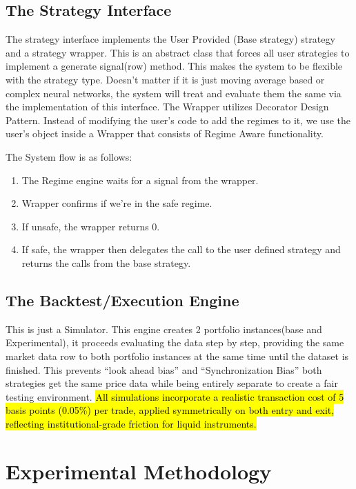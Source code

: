 \documentclass[conference]{IEEEtran}
\begin{document}
\subsection{The Strategy Interface}

The strategy interface implements the User Provided (Base strategy) strategy and a strategy wrapper. This is an abstract class that forces all user strategies to implement a generate signal(row) method. This makes the system to be flexible with the strategy type. Doesn't matter if it is just moving average based or complex neural networks, the system will treat and evaluate them the same via the implementation of this interface. The Wrapper utilizes Decorator Design Pattern. Instead of modifying the user's code to add the regimes to it, we use the user's object inside a Wrapper that consists of Regime Aware functionality.

The System flow is as follows:
\begin{enumerate}
\item The Regime engine waits for a signal from the wrapper.
\item Wrapper confirms if we're in the safe regime.
\item If unsafe, the wrapper returns 0.
\item If safe, the wrapper then delegates the call to the user defined strategy and returns the calls from the base strategy.
\end{enumerate}

\subsection{The Backtest/Execution Engine}

This is just a Simulator. This engine creates 2 portfolio instances(base and Experimental), it proceeds evaluating the data step by step, providing the same market data row to both portfolio instances at the same time until the dataset is finished. This prevents ``look ahead bias'' and ``Synchronization Bias'' both strategies get the same price data while being entirely separate to create a fair testing environment. \hl{All simulations incorporate a realistic transaction cost of 5 basis points (0.05\%) per trade, applied symmetrically on both entry and exit, reflecting institutional-grade friction for liquid instruments.}

\section{Experimental Methodology}
\end{document}
